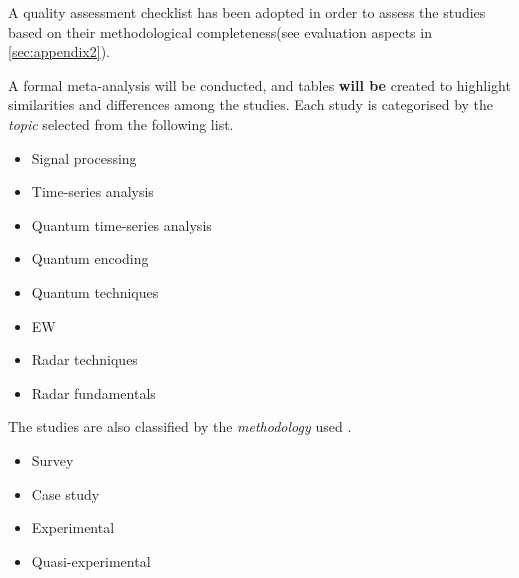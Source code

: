 A quality assessment checklist \cite{kitchenham_can_2010} has been adopted in order to assess the studies based on their methodological completeness(see evaluation aspects in \ref{sec:appendix2}). 

A formal meta-analysis will be conducted, and tables \textbf{will be} created to highlight similarities and differences among the studies.
Each study is categorised by the \emph{topic} selected from the following list.
\begin{itemize}
    \item Signal processing
    \item Time-series analysis
    \item Quantum time-series analysis
    \item Quantum encoding
    \item Quantum techniques
    \item \ac{EW}
    \item Radar techniques
    \item Radar fundamentals
\end{itemize}

The studies are also classified by the \emph{methodology} used \cite{wohlin_empirical_2012}.
\begin{itemize}
    \item Survey
    \item Case study
    \item Experimental
    \item Quasi-experimental
\end{itemize}


